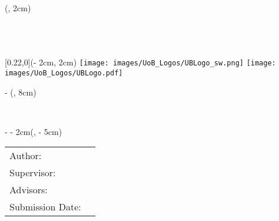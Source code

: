 \begin{titlepage}

	\begin{textblock*}{\textwidth}(\coverborderleft, 2cm)%
		\setlength{\baselineskip}{11pt}%
		\ifx \monochromeCoverInside \undefined
			\textcolor{UniversitaetFarbe} { %
				\fontsize{9}{11}\selectfont%
				\sffamily \chair\\%
				\sffamily \faculty\\%
				\sffamily \uni }
		\else
			\textcolor{black} { %
				\fontsize{9}{11}\selectfont%
				\sffamily \chair\\%
				\sffamily \faculty\\%
				\sffamily \uni }
		\fi
	\end{textblock*}%

	\begin{textblock*}{\UniversitaetLogoHoehe}[0.22,0](\paperwidth - 2cm, 2cm)%
		\ifx \monochromeCoverInside \undefined
			\texttt{[image: images/UoB\_Logos/UBLogo\_sw.png]}%
		\else
			\texttt{[image: images/UoB\_Logos/UBLogo.pdf]}%
		\fi
	\end{textblock*}%

	\begin{textblock*}{\paperwidth - \coverborderleft -2cm}(\coverborderleft, 8cm)%
		\raggedright %
		{\sffamily \Large \worktype}\\
		{\sffamily \huge \titleFirstLanguage \par}
		\vspace{1cm}
		{\sffamily \huge \titleForeignLanguage \par}
	\end{textblock*}
	\begin{textblock*}{\paperwidth - \coverborderleft - 2cm}(\coverborderleft, \paperheight - 5cm)%
		\begin{tabular}{l l}
			\sffamily Author:          & \sffamily \authorname     \\
			\sffamily Supervisor:      & \sffamily \supervisor     \\
			\sffamily Advisors:        & \sffamily \advisor        \\
			\sffamily Submission Date: & \sffamily \submissionDate
		\end{tabular}
	\end{textblock*}

	~\\ %
\end{titlepage}
